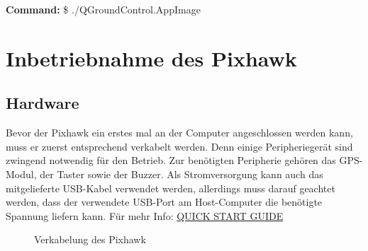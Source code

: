 \documentclass[12pt]{article} %
\begin{document}
	\noindent\hspace*{30mm} \textbf{Command:} \$ ./QGroundControl.AppImage\\
	
	\section{Inbetriebnahme des Pixhawk}
	
	\subsection{Hardware}
	Bevor der Pixhawk ein erstes mal an der Computer angeschlossen werden kann, muss er zuerst entsprechend verkabelt werden. Denn einige Peripheriegerät sind zwingend notwendig für den Betrieb. Zur benötigten Peripherie gehören das GPS-Modul, der Taster sowie der Buzzer. Als Stromversorgung kann auch das mitgelieferte USB-Kabel verwendet werden, allerdings muss darauf geachtet werden, dass der verwendete USB-Port am Host-Computer die benötigte Spannung liefern kann. Für mehr Info: \href{https://3dr.com/wp-content/uploads/2014/03/pixhawk-manual-rev7.pdf}{QUICK START GUIDE}
	
	\begin{figure}[H]
		\centering
		\caption{Verkabelung des Pixhawk}
		\label{2}
	\end{figure}
	
\end{document}
